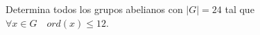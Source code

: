 \question 
Determina todos los grupos abelianos con $|G| = 24$ tal que
$\forall x \in G \quad ord(x) \le 12$.